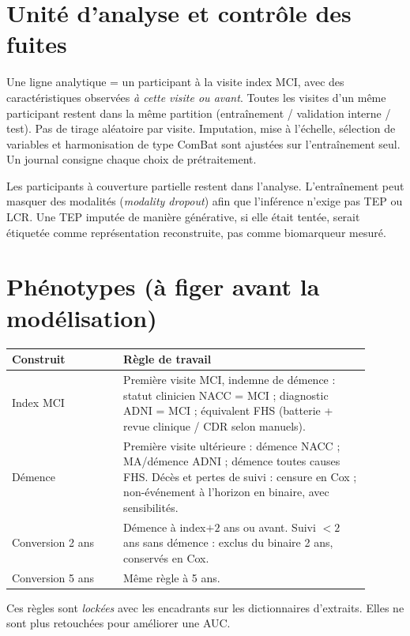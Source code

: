 \section{Unité d'analyse et contrôle des fuites}

Une ligne analytique = un participant à la visite index MCI, avec des caractéristiques observées \emph{à cette visite ou avant}. Toutes les visites d'un même participant restent dans la même partition (entraînement / validation interne / test). Pas de tirage aléatoire par visite. Imputation, mise à l'échelle, sélection de variables et harmonisation de type ComBat sont ajustées sur l'entraînement seul. Un journal consigne chaque choix de prétraitement.

Les participants à couverture partielle restent dans l'analyse. L'entraînement peut masquer des modalités (\emph{modality dropout}) afin que l'inférence n'exige pas TEP ou LCR. Une TEP imputée de manière générative, si elle était tentée, serait étiquetée comme représentation reconstruite, pas comme biomarqueur mesuré.

\section{Phénotypes (à figer avant la modélisation)}

\begin{center}
\begin{tabular}{p{0.28\linewidth}p{0.62\linewidth}}
\hline
\textbf{Construit} & \textbf{Règle de travail} \\
            \hline
Index MCI & Première visite MCI, indemne de démence : statut clinicien NACC = MCI ; diagnostic ADNI = MCI ; équivalent FHS (batterie + revue clinique / CDR selon manuels). \\
Démence & Première visite ultérieure : démence NACC ; MA/démence ADNI ; démence toutes causes FHS. Décès et pertes de suivi : censure en Cox ; non-événement à l'horizon en binaire, avec sensibilités. \\
Conversion 2 ans & Démence à index$+2$ ans ou avant. Suivi $< 2$ ans sans démence : exclus du binaire 2 ans, conservés en Cox. \\
Conversion 5 ans & Même règle à 5 ans. \\
            \hline
        \end{tabular}
\end{center}

Ces règles sont \emph{lockées} avec les encadrants sur les dictionnaires d'extraits. Elles ne sont plus retouchées pour améliorer une AUC.

